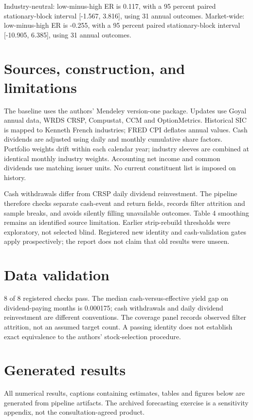 \documentclass[10pt]{article}
\begin{document}
Industry-neutral: low-minus-high ER is 0.117, with a 95 percent paired stationary-block interval [-1.567, 3.816], using 31 annual outcomes. 
Market-wide: low-minus-high ER is -0.255, with a 95 percent paired stationary-block interval [-10.905, 6.385], using 31 annual outcomes. 

\section{Sources, construction, and limitations}
The baseline uses the authors' Mendeley version-one package. Updates use Goyal annual data, WRDS CRSP, Compustat, CCM and OptionMetrics. Historical SIC is mapped to Kenneth French industries; FRED CPI deflates annual values. Cash dividends are adjusted using daily and monthly cumulative share factors. Portfolio weights drift within each calendar year; industry sleeves are combined at identical monthly industry weights. Accounting net income and common dividends use matching issuer units. No current constituent list is imposed on history.

Cash withdrawals differ from CRSP daily dividend reinvestment. The pipeline therefore checks separate cash-event and return fields, records filter attrition and sample breaks, and avoids silently filling unavailable outcomes. Table 4 smoothing remains an identified source limitation. Earlier strip-rebuild thresholds were exploratory, not selected blind. Registered new identity and cash-validation gates apply prospectively; the report does not claim that old results were unseen.


\section{Data validation}
8 of 8 registered checks pass. The median cash-versus-effective yield gap on dividend-paying months is 0.000175; cash withdrawals and daily dividend reinvestment are different conventions. The coverage panel records observed filter attrition, not an assumed target count. A passing identity does not establish exact equivalence to the authors' stock-selection procedure.

\section{Generated results}
All numerical results, captions containing estimates, tables and figures below are generated from pipeline artifacts. The archived forecasting exercise is a sensitivity appendix, not the consultation-agreed product.
\end{document}
